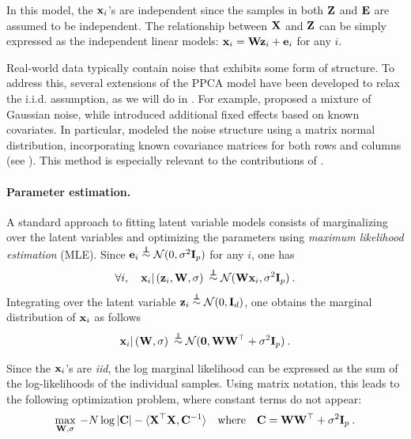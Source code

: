 In this model, the ${\mathbf{x}}_i$'s are independent since the samples in both ${\mathbf{Z}}$ and ${\mathbf{E}}$ are assumed to be independent. The relationship between ${\mathbf{X}}$ and ${\mathbf{Z}}$ can be simply expressed as the independent linear models: ${\mathbf{x}}_i = {\mathbf{W}} {\mathbf{z}}_i + {\mathbf{e}}_i$ for any $i$.

\begin{remark}
    Real-world data typically contain noise that exhibits some form of structure. To address this, several extensions of the PPCA model have been developed to relax the i.i.d. assumption, as we will do in . For example, \cite{zhao2014robust} proposed a mixture of Gaussian noise, while \cite{kalaitzis2011residual} introduced additional fixed effects based on known covariates. In particular, \cite{allen2014generalized} modeled the noise structure using a matrix normal distribution, incorporating known covariance matrices for both rows and columns (see ). This method is especially relevant to the contributions of .
\end{remark}


\paragraph{Parameter estimation.} A standard approach to fitting latent variable models consists of marginalizing over the latent variables and optimizing the parameters using \emph{maximum likelihood estimation} (MLE). Since ${\mathbf{e}}_i \stackrel{\perp\!\!\!\!\perp}{\sim} \mathcal{N}(0, \sigma^2 {\mathbf{I}}_p)$ for any $i$, one has
\begin{align}\label{eq:ppca_likelihood}
    \forall i, \quad {\mathbf{x}}_i | \left( {\mathbf{z}}_i, {\mathbf{W}}, \sigma \right) \: \stackrel{\perp\!\!\!\!\perp}{\sim} \mathcal{N}({\mathbf{W}} {\mathbf{x}}_i, \sigma^2 {\mathbf{I}}_p) \:.
\end{align}
Integrating over the latent variable ${\mathbf{z}}_i \stackrel{\perp\!\!\!\!\perp}{\sim} \mathcal{N}(0, {\mathbf{I}}_d)$, one obtains the marginal distribution of ${\mathbf{x}}_i$ as follows
\begin{align}\label{eq:ppca_marginal}
    {\mathbf{x}}_i | \left( {\mathbf{W}}, \sigma \right) \: \stackrel{\perp\!\!\!\!\perp}{\sim} \mathcal{N}(\bm{0}, {\mathbf{W}} {\mathbf{W}}^\top + \sigma^2 {\mathbf{I}}_p) \:.
\end{align}

Since the ${\mathbf{x}}_i$'s are \emph{iid}, the log marginal likelihood can be expressed as the sum of the log-likelihoods of the individual samples. Using matrix notation, this leads to the following optimization problem, where constant terms do not appear:
\begin{align}
    \max_{{\mathbf{W}}, \sigma} \: -N \log |{\mathbf{C}}| - \langle {\mathbf{X}}^\top {\mathbf{X}}, {\mathbf{C}}^{-1} \rangle \quad \text{where} \quad {\mathbf{C}} = {\mathbf{W}} {\mathbf{W}}^\top + \sigma^2 {\mathbf{I}}_p \:.
\end{align}

